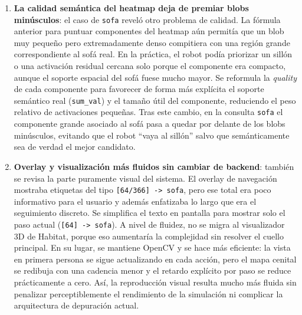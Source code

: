 \begin{enumerate}
  \item \textbf{La calidad semántica del heatmap deja de premiar blobs
        minúsculos}: el caso de \texttt{sofa} reveló otro problema de calidad.
        La fórmula anterior para puntuar componentes del heatmap aún permitía
        que un blob muy pequeño pero extremadamente denso compitiera con una
        región grande correspondiente al sofá real. En la práctica, el robot
        podía priorizar un sillón o una activación residual cercana solo porque
        el componente era compacto, aunque el soporte espacial del sofá fuese
        mucho mayor. Se reformula la \textit{quality} de cada componente para
        favorecer de forma más explícita el soporte semántico real
        (\texttt{sum\_val}) y el tamaño útil del componente, reduciendo el peso
        relativo de activaciones pequeñas. Tras este cambio, en la consulta
        \texttt{sofa} el componente grande asociado al sofá pasa a quedar por
        delante de los blobs minúsculos, evitando que el robot ``vaya al
        sillón'' salvo que semánticamente sea de verdad el mejor candidato.

  \item \textbf{Overlay y visualización más fluidos sin cambiar de backend}:
        también se revisa la parte puramente visual del sistema. El overlay de
        navegación mostraba etiquetas del tipo \texttt{[64/366] -> sofa}, pero
        ese total era poco informativo para el usuario y además enfatizaba lo
        largo que era el seguimiento discreto. Se simplifica el texto en
        pantalla para mostrar solo el paso actual (\texttt{[64] -> sofa}). A
        nivel de fluidez, no se migra al visualizador 3D de Habitat, porque
        eso aumentaría la complejidad sin resolver el cuello principal. En su
        lugar, se mantiene OpenCV y se hace más eficiente: la vista en primera
        persona se sigue actualizando en cada acción, pero el mapa cenital se
        redibuja con una cadencia menor y el retardo explícito por paso se
        reduce prácticamente a cero. Así, la reproducción visual resulta mucho
        más fluida sin penalizar perceptiblemente el rendimiento de la
        simulación ni complicar la arquitectura de depuración actual.


\end{enumerate}
